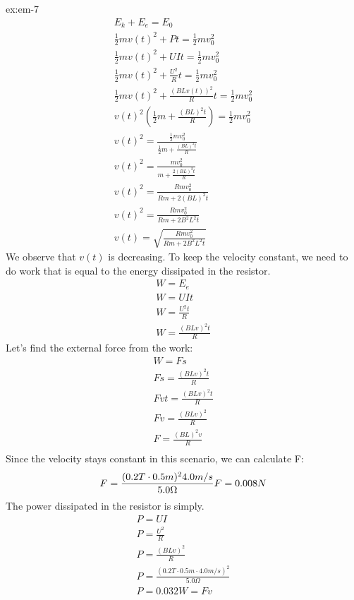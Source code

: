 \begin{solution}{ex:em-7}
\[\begin{gathered}
      E_k+E_e=E_0\\
      \frac{1}{2}mv(t)^2+Pt=\frac{1}{2}mv_0^2\\
      \frac{1}{2}mv(t)^2+UIt=\frac{1}{2}mv_0^2\\
      \frac{1}{2}mv(t)^2+\frac{U^2}{R}t=\frac{1}{2}mv_0^2\\
      \frac{1}{2}mv(t)^2+\frac{(BLv(t))^2}{R}t=\frac{1}{2}mv_0^2\\
      v(t)^2(\frac{1}{2}m+\frac{(BL)^2t}{R})=\frac{1}{2}mv_0^2\\
      v(t)^2=\frac{\frac{1}{2}mv_0^2}{\frac{1}{2}m+\frac{(BL)^2t}{R}}\\
      v(t)^2=\frac{mv_0^2}{m+\frac{2(BL)^2t}{R}}\\
      v(t)^2=\frac{Rmv_0^2}{Rm+2(BL)^2t}\\
      v(t)^2=\frac{Rmv_0^2}{Rm+2B^2L^2t}\\
      v(t)=\sqrt{\frac{Rmv_0^2}{Rm+2B^2L^2t}}
    \end{gathered}
  \]
    We observe that $v(t)$ is decreasing. To keep the velocity constant, we need to do work that is equal to the energy dissipated in the resistor.
    \[
      \begin{gathered}
        W=E_e\\
        W=UIt\\
        W=\frac{U^2t}{R}\\
        W=\frac{(BLv)^2t}{R}
      \end{gathered}
    \]
    Let's find the external force from the work:
    \[
      \begin{gathered}
        W=Fs\\
        Fs=\frac{(BLv)^2t}{R}\\
        Fvt=\frac{(BLv)^2t}{R}\\
        Fv=\frac{(BLv)^2}{R}\\
        F=\frac{(BL)^2v}{R}\\
      \end{gathered}
    \]
    Since the velocity stays constant in this scenario, we can calculate F:
    \[
        F=\frac{(0.2 T \cdot 0.5 m)^2 4.0 m/s}{5.0 \Omega}\\
        F=0.008N
    \]
    The power dissipated in the resistor is simply. 
    \[
      \begin{gathered}
        P=UI\\
        P=\frac{U^2}{R}\\
        P=\frac{(BLv)^2}{R}\\
        P=\frac{(0.2 T \cdot 0.5 m \cdot 4.0 m/s)^2}{5.0 \Omega}\\
        P= 0.032W = Fv
      \end{gathered}
    \]
\end{solution}
